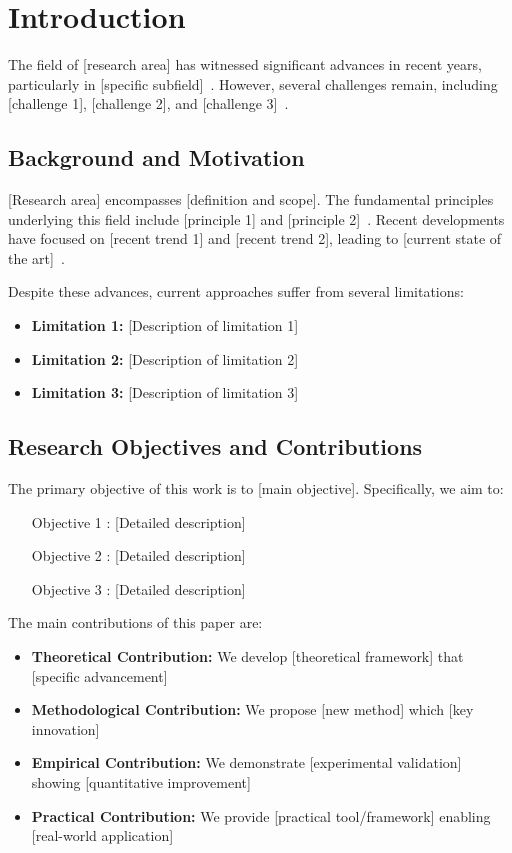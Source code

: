 \section{Introduction}
\label{sec:introduction}

The field of [research area] has witnessed significant advances in recent years, particularly in [specific subfield]~\cite{reference1,reference2}. However, several challenges remain, including [challenge 1], [challenge 2], and [challenge 3]~\cite{reference3}. 

\subsection{Background and Motivation}

[Research area] encompasses [definition and scope]. The fundamental principles underlying this field include [principle 1] and [principle 2]~\cite{reference4}. Recent developments have focused on [recent trend 1] and [recent trend 2], leading to [current state of the art]~\cite{reference5,reference6}.

Despite these advances, current approaches suffer from several limitations:
\begin{itemize}
    \item \textbf{Limitation 1:} [Description of limitation 1]~\cite{reference7}
    \item \textbf{Limitation 2:} [Description of limitation 2]~\cite{reference8}
    \item \textbf{Limitation 3:} [Description of limitation 3]~\cite{reference9}
\end{itemize}

\subsection{Research Objectives and Contributions}

The primary objective of this work is to [main objective]. Specifically, we aim to:
\begin{enumerate}
    \item [Objective 1]: [Detailed description]
    \item [Objective 2]: [Detailed description]  
    \item [Objective 3]: [Detailed description]
\end{enumerate}

The main contributions of this paper are:
\begin{itemize}
    \item \textbf{Theoretical Contribution:} We develop [theoretical framework] that [specific advancement]
    \item \textbf{Methodological Contribution:} We propose [new method] which [key innovation]
    \item \textbf{Empirical Contribution:} We demonstrate [experimental validation] showing [quantitative improvement]
    \item \textbf{Practical Contribution:} We provide [practical tool/framework] enabling [real-world application]
\end{itemize}

